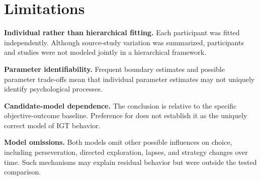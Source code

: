 \section{Limitations}

\textbf{Individual rather than hierarchical fitting.} Each participant was fitted independently. Although source-study variation was summarized, participants and studies were not modeled jointly in a hierarchical framework.

\textbf{Parameter identifiability.} Frequent boundary estimates and possible parameter trade-offs mean that individual parameter estimates may not uniquely identify psychological processes.

\textbf{Candidate-model dependence.} The conclusion is relative to the specific objective-outcome \QL{} baseline. Preference for \PVL{} does not establish it as the uniquely correct model of IGT behavior.

\textbf{Model omissions.} Both models omit other possible influences on choice, including perseveration, directed exploration, lapses, and strategy changes over time. Such mechanisms may explain residual behavior but were outside the tested comparison.
